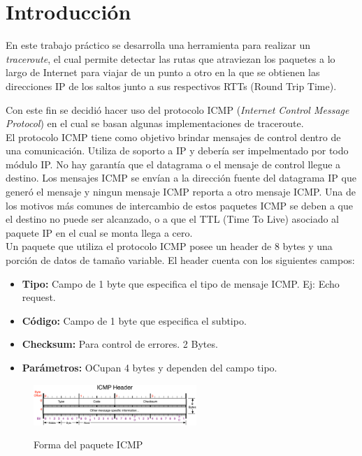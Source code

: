 \section{Introducción}

En este trabajo práctico se desarrolla una herramienta para realizar un \textit{traceroute}, el cual permite detectar las rutas que atraviezan los paquetes a lo largo de Internet para viajar de un punto a otro en la que se obtienen las direcciones IP de los saltos junto a sus respectivos RTTs (Round Trip Time).

Con este fin se decidió hacer uso del protocolo ICMP (\textit{Internet Control Message Protocol}) en el cual se basan algunas implementaciones de traceroute.\\

El protocolo ICMP tiene como objetivo brindar mensajes de control dentro de una comunicación\cite{ICMP}. Utiliza de soporto a IP y debería ser impelmentado por todo módulo IP. No hay garantía que el datagrama o el mensaje de control llegue a destino. Los mensajes ICMP se envían a la dirección fuente del datagrama IP que generó el mensaje y ningun mensaje ICMP reporta a otro mensaje ICMP. Una de los motivos más comunes de intercambio de estos paquetes ICMP se deben a que el destino no puede ser alcanzado, o a que el TTL (Time To Live) asociado al paquete IP en el cual se monta llega a cero.\\

Un paquete que utiliza el protocolo ICMP posee un header de 8 bytes y una porción de datos de tamaño variable. El header cuenta con los siguientes campos: 

\begin{itemize}
\item \textbf{Tipo:} Campo de 1 byte que especifica el tipo de mensaje ICMP. Ej: Echo request.
\item \textbf{Código:} Campo de 1 byte que especifica el subtipo.
\item \textbf{Checksum:} Para control de errores. 2 Bytes.
\item \textbf{Parámetros:} OCupan 4 bytes y dependen del campo tipo.
\end{itemize}

\begin{figure}[H]
\centering
\caption{Forma del paquete ICMP}
\includegraphics[width=0.55\textwidth]{modules/ICMP-Header.png}
 \label{fig:Header_ICMP}
\end{figure}

